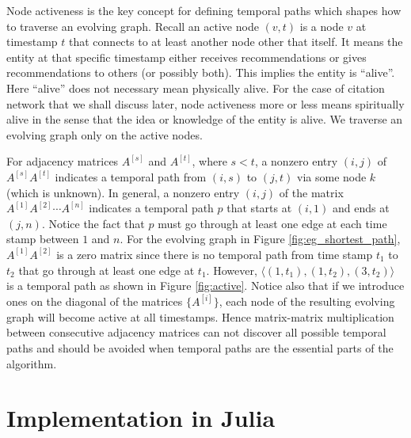 \documentclass[11pt,conference,compsocconf]{IEEEtran}
\theoremstyle{definition}
\begin{document}
Node activeness is the key concept for defining temporal paths which 
shapes how to traverse an evolving graph. 
Recall an active node $(v,t)$ is a node $v$ at timestamp $t$
that connects to at least another node other that itself.   
It means the entity at that specific timestamp either
receives recommendations or gives recommendations to others (or possibly both).
This implies the entity is ``alive''. Here ``alive'' does not necessary mean physically 
alive. For the case of citation network that we shall discuss later, node activeness more or less means spiritually alive in the sense that the idea or knowledge of the entity is alive.
We traverse an evolving graph only on the active nodes.

For adjacency matrices $A^{[s]}$ and $A^{[t]}$, where $s < t$, a nonzero entry
$(i,j)$ of $A^{[s]} A^{[t]}$ indicates a temporal path from $(i,s)$ to $(j,t)$ via
some node $k$ (which is unknown).
In general, a nonzero entry $(i,j)$ of the matrix $A^{[1]}A^{[2]}\cdots A^{[n]}$
indicates a temporal path $p$ that starts at $(i,1)$ and ends at  $(j,n)$.
Notice the fact that $p$ must go through at least one edge at each time stamp between $1$ and $n$.
For the evolving graph in Figure \ref{fig:eg_shortest_path}, $A^{[1]}A^{[2]}$
is a zero matrix since there is no temporal path from time stamp $t_1$ to $t_2$ that
go through at least one edge at $t_1$. However,
$\langle(1, t_1), (1, t_2), (3,t_2)\rangle$ is a temporal path as shown in Figure \ref{fig:active}.
Notice also that if we introduce ones on the diagonal of the matrices $\{A^{[i]}\}$,
each node of the resulting evolving graph will become 
active at all timestamps. 
Hence matrix-matrix multiplication between consecutive
adjacency matrices can not discover all possible temporal paths and should be avoided 
when temporal paths are the essential parts of the algorithm.


\section{Implementation in Julia}
\label{sec:implementation-julia}
\end{document}
